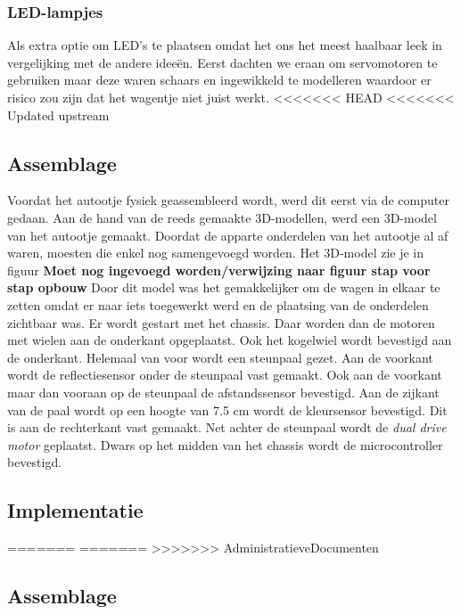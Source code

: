 \documentclass[a4paper,twoside,kulak]{kulakreport} %
\begin{document}
\subsubsection{LED-lampjes}
Als extra optie om LED's te plaatsen omdat het ons het meest haalbaar leek in vergelijking met de andere ideeën. Eerst dachten we eraan om servomotoren te gebruiken maar deze waren schaars en ingewikkeld te modelleren waardoor er risico zou zijn dat het wagentje niet juist werkt.
<<<<<<< HEAD
<<<<<<< Updated upstream
\label{LED-lampjes}
\subsection{Assemblage}
Voordat het autootje fysiek geassembleerd wordt, werd dit eerst via de computer gedaan. Aan de hand van de reeds gemaakte 3D-modellen, werd een 3D-model van het autootje gemaakt. Doordat de apparte onderdelen van het autootje al af waren, moesten die enkel nog samengevoegd worden. Het 3D-model zie je in figuur
{\bf{\Large Moet nog ingevoegd worden/verwijzing naar figuur stap voor stap opbouw}}
Door dit model was het gemakkelijker om de wagen in elkaar te zetten omdat er naar iets toegewerkt werd en de plaatsing van de onderdelen zichtbaar was. Er wordt gestart met het chassis. Daar worden dan de motoren met wielen aan de onderkant opgeplaatst. Ook het kogelwiel wordt bevestigd aan de onderkant. Helemaal van voor wordt een steunpaal gezet. Aan de voorkant wordt de reflectiesensor onder de steunpaal vast gemaakt. Ook aan de voorkant maar dan vooraan op de steunpaal de afstandssensor bevestigd. Aan de zijkant van de paal wordt op een hoogte van 7.5 cm wordt de kleursensor bevestigd. Dit is aan de rechterkant vast gemaakt. Net achter de steunpaal wordt de {\it dual drive motor} geplaatst. Dwars op het midden van het chassis wordt de microcontroller bevestigd.



\label{Assemblage}
\subsection{Implementatie}
\label{Implementatie}
=======
=======
>>>>>>> AdministratieveDocumenten


\subsection{Assemblage}
\end{document}

